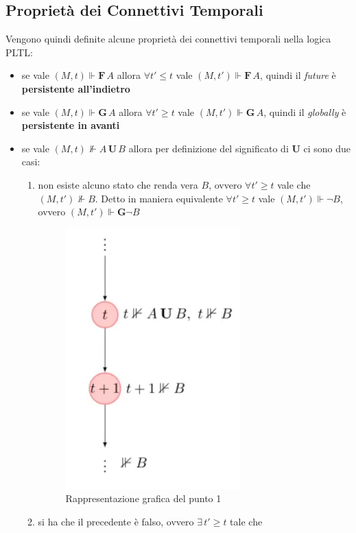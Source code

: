 \documentclass[a4paper,12pt, oneside]{book}
\begin{document}
\subsection{Proprietà dei Connettivi Temporali}
\begin{definizione}
  Vengono quindi definite alcune proprietà dei connettivi temporali nella logica
  PLTL:
  \begin{itemize}
    \item se vale $(M,t)\Vdash \mathbf{F}\,A$ allora $\forall t'\leq t$ vale
    $(M,t')\Vdash \mathbf{F}\,A$, quindi il \emph{future} è \textbf{persistente
      all'indietro}
    \item se vale $(M,t)\Vdash \mathbf{G}\,A$ allora $\forall t'\geq t$ vale
    $(M,t')\Vdash \mathbf{G}\,A$, quindi il \emph{globally} è
    \textbf{persistente in avanti}
    \newpage
    \item se vale $(M,t)\nVdash A\,\mathbf{U}\,B$ allora per definizione del
    significato di \textbf{U} ci sono due casi:
    \begin{enumerate}
      \item non esiste alcuno stato che renda vera $B$, ovvero $\forall t'\geq
      t$ vale che $(M,t')\nVdash B$. Detto in maniera equivalente
      $\forall t'\geq t$ vale $(M,t')\Vdash\neg B$, ovvero $(M,t')\Vdash
      \mathbf{G}\neg B$
      \begin{figure}[H]
        \centering
        \includegraphics[scale = 0.35]{img/pltl7.png}
        \caption{Rappresentazione grafica del punto 1}
      \end{figure}
      \item si ha che il precedente è falso, ovvero $\exists\,t'\geq t$ tale che

\end{enumerate}
\end{itemize}
\end{definizione}
\end{document}
